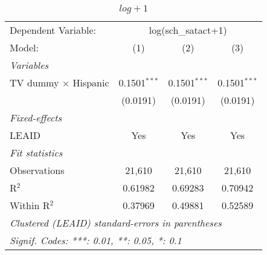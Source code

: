 \begin{table}[htbp]
\centering
\caption{ $log + 1$}
\begin{tabular}{lccc}
\tabularnewline\midrule\midrule
Dependent Variable:&\multicolumn{3}{c}{log(sch\_satact+1)}\\
Model:&(1) & (2) & (3)\\
\midrule \emph{Variables}&   &   &  \\
TV dummy $\times$ Hispanic & 0.1501$^{***}$ & 0.1501$^{***}$ & 0.1501$^{***}$\\
  &(0.0191) & (0.0191) & (0.0191)\\
\midrule \emph{Fixed-effects}&   &   &  \\
LEAID & Yes & Yes & Yes\\
\midrule \emph{Fit statistics}&  & & \\
Observations & 21,610&21,610&21,610\\
R$^2$ & 0.61982&0.69283&0.70942\\
Within R$^2$ & 0.37969&0.49881&0.52589\\
\midrule\midrule\multicolumn{4}{l}{\emph{Clustered (LEAID) standard-errors in parentheses}}\\
\multicolumn{4}{l}{\emph{Signif. Codes: ***: 0.01, **: 0.05, *: 0.1}}\\
\end{tabular}
\end{table}

